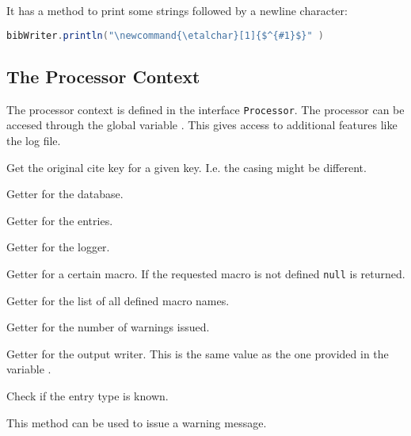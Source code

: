 It has a method  to print some strings followed by a
newline character:

\begin{lstlisting}[language=Java]
  bibWriter.println("\newcommand{\etalchar}[1]{$^{#1}$}" )
\end{lstlisting}


\subsection{The Processor Context}

The processor context is defined in the interface \texttt{Processor}.
The processor can be accesed through the global variable
. This gives access to additional features like the
log file.

\begin{methods}

    Get the original cite key for a given key. I.e. the casing might be
    different.

    Getter for the database.

    Getter for the entries.

    Getter for the logger.

    Getter for a certain macro. If the requested macro is not defined
    \texttt{null} is returned.

    Getter for the list of all defined macro names.

    Getter for the number of warnings issued.

    Getter for the output writer. This is the same value as the one provided in
    the variable .

    Check if the entry type is known.

    This method can be used to issue a warning message.

\end{methods}


